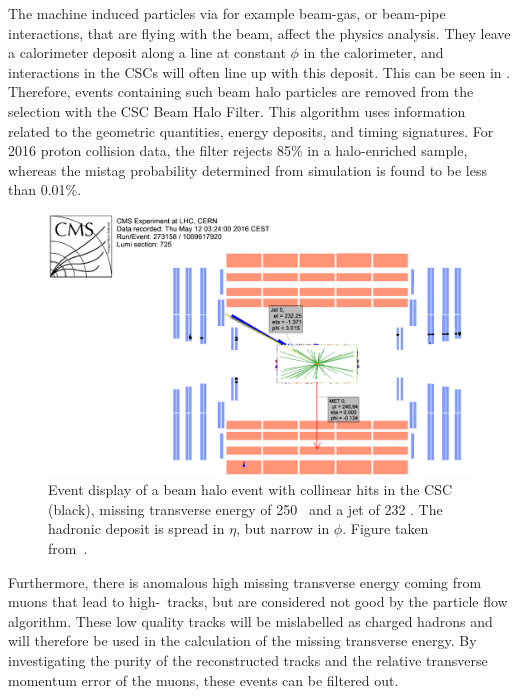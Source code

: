 The machine induced particles via for example beam-gas, or beam-pipe interactions, that are flying with the beam, affect the physics analysis. They leave a calorimeter deposit along a line at constant $\phi$ in the calorimeter, and interactions in the CSCs will often line up with this deposit. This can be seen in . Therefore, events containing such beam halo particles are removed from the selection with the CSC Beam Halo Filter. This algorithm uses information related to the geometric quantities, energy deposits, and timing signatures. For 2016 proton collision data, the filter rejects 85\% in a halo-enriched sample, whereas the mistag probability determined from simulation is found to  be less than 0.01\%.  
\begin{figure}[htbp]
	\centering
	\includegraphics[width=.7\linewidth]{5_EventSelection/Figures/Figure_004}
	\caption{Event display of a beam halo event with collinear hits in the CSC (black), missing transverse energy of 250 \GeV\, and a jet of 232 \GeV. The hadronic deposit is spread in $\eta$, but narrow in $\phi$. Figure taken from~\cite{CMS-PAS-JME-16-004}. }
	\label{fig:beamhalo}
\end{figure}

Furthermore, there is anomalous high missing transverse energy coming from muons that lead to high-\pt\ tracks, but are considered not good by the particle flow algorithm. These low quality tracks will be  mislabelled as charged hadrons and will therefore be used in the calculation of the missing transverse energy. By investigating the purity of the reconstructed tracks and the relative transverse momentum error of the muons, these events can be filtered out. 





